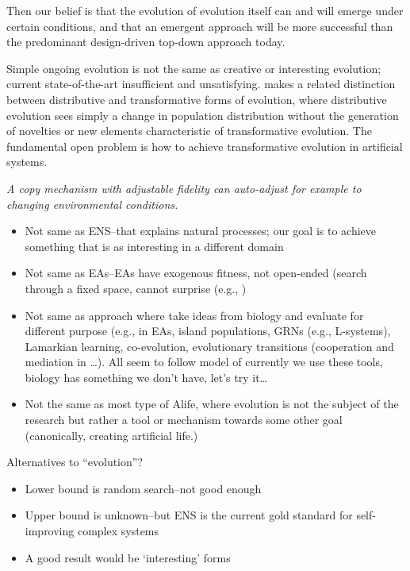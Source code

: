 Then our belief is that the evolution of evolution itself can and will emerge under certain conditions, and that an emergent approach will be more successful than the predominant design-driven top-down approach today.

Simple ongoing evolution is not the same as creative or interesting evolution; current state-of-the-art insufficient and unsatisfying. \autocite{Bourrat2015} makes a related distinction between distributive and transformative forms of evolution, where distributive evolution sees simply a change in population distribution without the generation of novelties or new elements characteristic of transformative evolution. The fundamental open problem is how to achieve transformative evolution in artificial systems.

\emph{A copy mechanism with adjustable fidelity can auto-adjust for example to changing environmental conditions.}

\begin{itemize}
	\item
	      Not same as ENS--that explains natural processes; our goal is to achieve something that is as interesting in a different domain
	\item 
	      Not same as EAs--EAs have exogenous fitness, not open-ended (search through a fixed space, cannot surprise (e.g., \autocite{Nellis2014})
	\item  
	      Not same as approach where take ideas from biology and evaluate for different purpose (e.g., in EAs, island populations, GRNs (e.g., L-systems), Lamarkian learning, co-evolution, evolutionary transitions (cooperation and mediation in \autocite{Defaweux:2005fk}\ldots{}). All seem to follow model of currently we use these tools, biology has something we don't have, let's try it\ldots{}
	\item
	      Not the same as most type of Alife, where evolution is not the subject of the research but rather a tool or mechanism towards some other goal (canonically, creating artificial life.)
\end{itemize}

Alternatives to ``evolution''?

\begin{itemize}
	\item Lower bound is random search--not good enough
	\item Upper bound is unknown--but ENS is the current gold standard for self-improving complex systems
	\item A good result would be `interesting' forms
\end{itemize}

